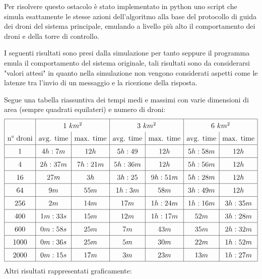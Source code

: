 \documentclass[a4paper, 11pt]{article}
\begin{document}
Per risolvere questo ostacolo è stato implementato in python uno script che simula esattamente le stesse azioni dell'algoritmo alla base del protocollo di guida dei droni del sistema principale, emulando a livello più alto il comportamento dei droni e della torre di controllo.

I seguenti risultati sono presi dalla simulazione per tanto seppure il programma emula il comportamento del sistema originale, tali risultati sono da considerarsi "valori attesi" in quanto nella simulazione non vengono considerati aspetti come le latenze tra l'invio di un messaggio e la ricezione della risposta.


Segue una tabella riassuntiva dei tempi medi e massimi con varie dimensioni di area (sempre quadrati equilateri) e numero di droni:
\[  \large
\renewcommand{\arraystretch}{1.5}
    \begin{array}{|c|c|c|c|c|c|c|}
        \hline
        & \multicolumn{2}{c|}{1\ km^2} & \multicolumn{2}{c|}{3\ km^2}& \multicolumn{2}{c|}{6\ km^2}\\
        \text{n°\ droni}& \text{avg. time}  & \text{max. time}  & \text{avg. time} & \text{max. time}  & \text{avg. time} & \text{max. time} \\
        \hline
        1 & 4h: 7m  & 12h & 5h: 49& 12h & 5h: 58m & 12h\\ 
        \hline
        4 & 2h: 37m & 7h: 21m & 5h: 36m & 12h & 5h: 56m & 12h \\
        \hline
        16 & 27m & 3h & 3h: 25 & 9h: 51m & 5h: 28m & 12h \\
        \hline    
        64 & 9m  & 55m & 1h: 3m & 58m & 3h: 49m & 12h \\
        \hline
        256 & 2m & 14m & 17m & 1h : 24m & 1h: 16m & 3h: 35m \\ 
        \hline
        400 & 1m: 33s & 15m & 12m & 1h: 17m & 52m & 3h: 28m \\ 
        \hline
        600 & 0m: 58s & 25m & 7m & 43m & 35m & 2h: 32m \\ 
        \hline
        1000 & 0m: 36s & 25m & 5m & 30m & 22m & 1h: 52m \\ 
        \hline
        2000 & 0m: 15s & 17m & 3m & 23m & 13m & 1h: 27m \\ 
        \hline
    \end{array}
\]
Altri risultati rappresentati graficamente: \\
\end{document}
